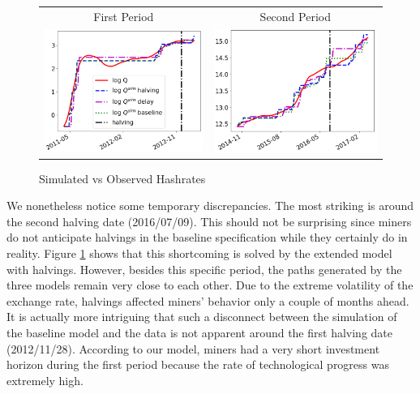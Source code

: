 \documentclass[12pt, a4paper]{article}
\begin{document}
\begin{figure}[]
\caption{Simulated vs Observed Hashrates}
\label{fig:hashrates_halving}\centering
\begin{tabular}{cc}
First Period & Second Period \\
\includegraphics[scale=0.45]{images/Q_all_1.png} & %
\includegraphics[scale=0.45]{images/Q_all_2.png}%
\end{tabular}%
\end{figure}


We nonetheless notice some temporary discrepancies. The most striking is around the second
halving date (2016/07/09).
This should not be surprising since miners do not
anticipate halvings in the baseline specification while they certainly do in reality.
Figure \ref{fig:hashrates_halving} shows that this shortcoming is solved by the extended model
with halvings.
However, besides this specific period, the paths generated by the three models
remain very close to each other. Due to the extreme volatility of the exchange rate,
halvings affected miners' behavior only a couple of months ahead. It is actually more intriguing that such a disconnect between the simulation
of the baseline model and the data is not apparent around the first halving date (2012/11/28). According to our model,
miners had a very short investment horizon during the first period because the rate of technological progress was extremely high.
\end{document}
